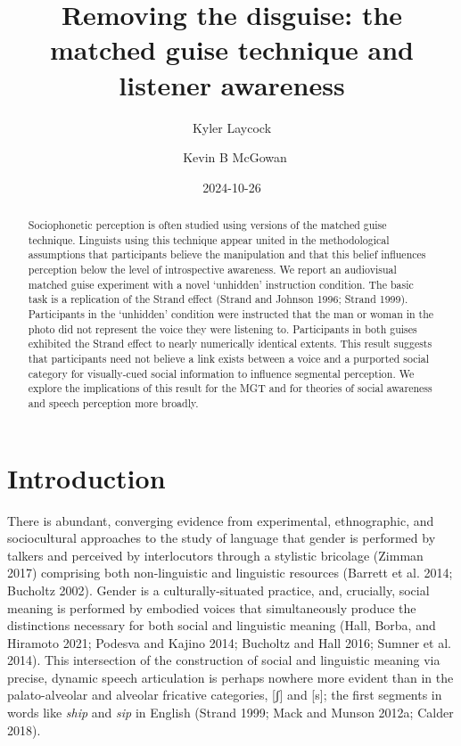 \documentclass[
  letterpaper,
  DIV=11,
  numbers=noendperiod]{scrartcl}
\title{Removing the disguise: the matched guise technique and listener
awareness}
\author{Kyler Laycock \and ~Kevin B McGowan}
\date{2024-10-26}
\begin{document}
\maketitle
\begin{abstract}
Sociophonetic perception is often studied using versions of the matched
guise technique. Linguists using this technique appear united in the
methodological assumptions that participants believe the manipulation
and that this belief influences perception below the level of
introspective awareness. We report an audiovisual matched guise
experiment with a novel `unhidden' instruction condition. The basic task
is a replication of the Strand effect (Strand and Johnson 1996; Strand
1999). Participants in the `unhidden' condition were instructed that the
man or woman in the photo did not represent the voice they were
listening to. Participants in both guises exhibited the Strand effect to
nearly numerically identical extents. This result suggests that
participants need not believe a link exists between a voice and a
purported social category for visually-cued social information to
influence segmental perception. We explore the implications of this
result for the MGT and for theories of social awareness and speech
perception more broadly.
\end{abstract}


\section{Introduction}\label{sec-intro}

There is abundant, converging evidence from experimental, ethnographic,
and sociocultural approaches to the study of language that gender is
performed by talkers and perceived by interlocutors through a stylistic
bricolage (Zimman 2017) comprising both non-linguistic and linguistic
resources (Barrett et al. 2014; Bucholtz 2002). Gender is a
culturally-situated practice, and, crucially, social meaning is
performed by embodied voices that simultaneously produce the
distinctions necessary for both social and linguistic meaning (Hall,
Borba, and Hiramoto 2021; Podesva and Kajino 2014; Bucholtz and Hall
2016; Sumner et al. 2014). This intersection of the construction of
social and linguistic meaning via precise, dynamic speech articulation
is perhaps nowhere more evident than in the palato-alveolar and alveolar
fricative categories, {[}ʃ{]} and {[}s{]}; the first segments in words
like \emph{ship} and \emph{sip} in English (Strand 1999; Mack and Munson
2012a; Calder 2018).
\end{document}
